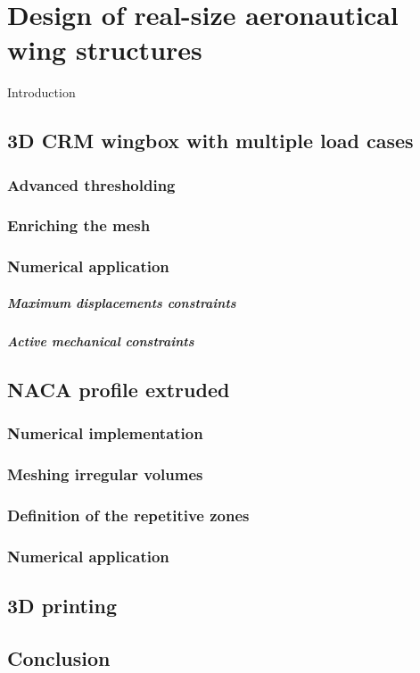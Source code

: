 \setchapterpreamble[u]{\margintoc}
\chapter{Design of real-size aeronautical wing structures}
Introduction
\section{3D CRM wingbox with multiple load cases}

\subsection{Advanced thresholding}

\subsection{Enriching the mesh}

\subsection{Numerical application}

\paragraph{Maximum displacements constraints}

\paragraph{Active mechanical constraints}

\section{NACA profile extruded}

\subsection{Numerical implementation}

\subsection{Meshing irregular volumes}

\subsection{Definition of the repetitive zones}

\subsection{Numerical application}

\section{3D printing}

\section{Conclusion}